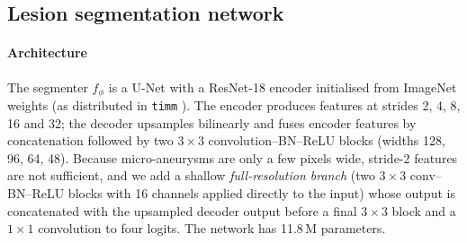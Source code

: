 \subsection{Lesion segmentation network}
\label{sec:seg}
\paragraph{Architecture} The segmenter $f_\phi$ is a U-Net \citep{ronneberger2015} with a ResNet-18 encoder \citep{he2016resnet} initialised from ImageNet weights (as distributed in \texttt{timm} \citep{wightman2019timm}). The encoder produces features at strides 2, 4, 8, 16 and 32; the decoder upsamples bilinearly and fuses encoder features by concatenation followed by two $3\times3$ convolution--BN--ReLU blocks (widths 128, 96, 64, 48). Because micro-aneurysms are only a few pixels wide, stride-2 features are not sufficient, and we add a shallow \emph{full-resolution branch} (two $3\times3$ conv--BN--ReLU blocks with 16 channels applied directly to the input) whose output is concatenated with the upsampled decoder output before a final $3\times3$ block and a $1\times1$ convolution to four logits. The network has 11.8\,M parameters.

